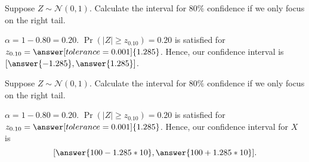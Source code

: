 \documentclass{ximera}
\begin{document}
\begin{problem}
Suppose $Z\sim \mathcal N(0,1)$. Calculate the interval for $80\%$ confidence if we only focus on the right tail. 
\begin{explanation}
$\alpha=1-0.80=0.20$.
$\Pr(|Z|\geq z_{0.10})=0.20$ is satisfied for $z_{0.10}=\answer[tolerance=0.001]{1.285}$. Hence, our confidence interval is $[\answer{-1.285},\answer{1.285}]$. 

\end{explanation}
\end{problem}


\begin{problem}
Suppose $Z\sim \mathcal N(0,1)$. Calculate the interval for $80\%$ confidence if we only focus on the right tail. 
\begin{explanation}
$\alpha=1-0.80=0.20$.
$\Pr(|Z|\geq z_{0.10})=0.20$ is satisfied for $z_{0.10}=\answer[tolerance=0.001]{1.285}$. Hence, our confidence interval  for $X$ is
$$[\answer{100-1.285*10},\answer{100+1.285*10}].$$

\end{explanation}
\end{problem}
\end{document}
